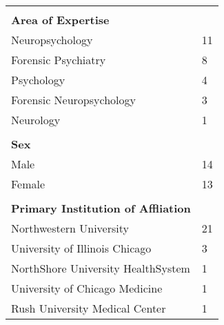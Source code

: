 
\begin{tabular}{R{3in}L{2in}}
 \\ 
\textbf{Area of Expertise}   &  \\ 
Neuropsychology             & 11 \\
Forensic Psychiatry         & 8  \\
Psychology                  & 4  \\
Forensic Neuropsychology    & 3  \\
Neurology                   & 1  \\ 
 \\ %
\textbf{Sex}   &  \\ 
Male   & 14 \\
Female & 13 \\ 
 \\ %
 \textbf{Primary Institution of Affliation}                          &  \\ 
Northwestern University                      & 21 \\
University of Illinois Chicago               & 3  \\
NorthShore University HealthSystem           & 1  \\
University of Chicago Medicine               & 1  \\
Rush University Medical Center               & 1  \\ 
\end{tabular}

